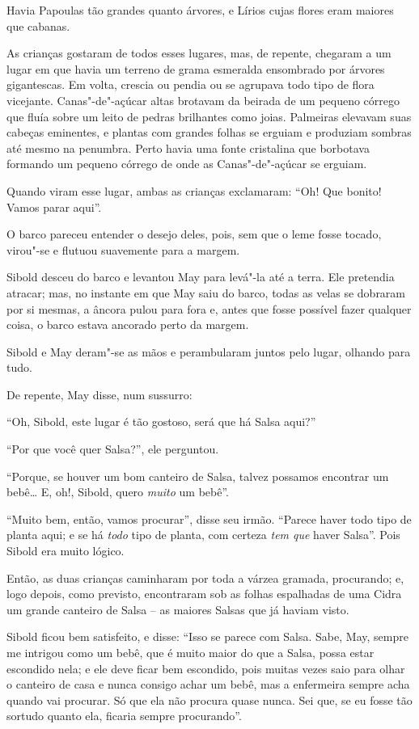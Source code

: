 Havia Papoulas tão grandes quanto árvores, e Lírios cujas flores eram
maiores que cabanas.

As crianças gostaram de todos esses lugares, mas, de repente, chegaram a
um lugar em que havia um terreno de grama esmeralda ensombrado por
árvores gigantescas. Em volta, crescia ou pendia ou se agrupava todo
tipo de flora vicejante. Canas"-de"-açúcar altas brotavam da beirada de um
pequeno córrego que fluía sobre um leito de pedras brilhantes como
joias. Palmeiras elevavam suas cabeças eminentes, e plantas com grandes
folhas se erguiam e produziam sombras até mesmo na penumbra. Perto havia
uma fonte cristalina que borbotava formando um pequeno córrego de onde
as Canas"-de"-açúcar se erguiam.

Quando viram esse lugar, ambas as crianças exclamaram: ``Oh! Que bonito!
Vamos parar aqui''.

O barco pareceu entender o desejo deles, pois, sem que o leme fosse
tocado, virou"-se e flutuou suavemente para a margem.

Sibold desceu do barco e levantou May para levá"-la até a terra. Ele
pretendia atracar; mas, no instante em que May saiu do barco, todas as
velas se dobraram por si mesmas, a âncora pulou para fora e, antes que
fosse possível fazer qualquer coisa, o barco estava ancorado perto da
margem.

Sibold e May deram"-se as mãos e perambularam juntos pelo lugar, olhando
para tudo.

De repente, May disse, num sussurro:

``Oh, Sibold, este lugar é tão gostoso, será que há Salsa aqui?''

``Por que você quer Salsa?'', ele perguntou.

``Porque, se houver um bom canteiro de Salsa, talvez possamos encontrar
um bebê… E, oh!, Sibold, quero \emph{muito} um bebê''.

``Muito bem, então, vamos procurar'', disse seu irmão. ``Parece haver
todo tipo de planta aqui; e se há \emph{todo} tipo de planta, com
certeza \emph{tem que} haver Salsa''. Pois Sibold era muito lógico.

Então, as duas crianças caminharam por toda a várzea gramada,
procurando; e, logo depois, como previsto, encontraram sob as folhas
espalhadas de uma Cidra um grande canteiro de Salsa -- as maiores Salsas
que já haviam visto.

Sibold ficou bem satisfeito, e disse: ``Isso se parece com Salsa. Sabe,
May, sempre me intrigou como um bebê, que é muito maior do que a Salsa,
possa estar escondido nela; e ele deve ficar bem escondido, pois muitas
vezes saio para olhar o canteiro de casa e nunca consigo achar um bebê,
mas a enfermeira sempre acha quando vai procurar. Só que ela não procura
quase nunca. Sei que, se eu fosse tão sortudo quanto ela, ficaria sempre
procurando''.

